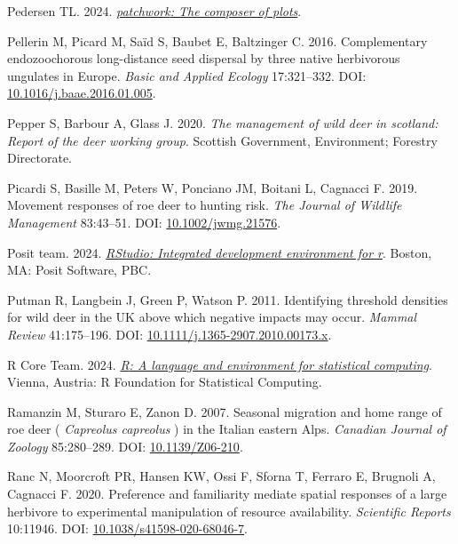 \documentclass[10pt,a4paper]{article}
\newlength{\cslhangindent}
\newenvironment{CSLReferences}[2] %
 {\begin{list}{}{%
  \setlength{\itemindent}{0pt}
  \setlength{\leftmargin}{0pt}
  \setlength{\parsep}{0pt}
  \ifodd #1
   \setlength{\leftmargin}{\cslhangindent}
   \setlength{\itemindent}{-1\cslhangindent}
  \fi
  \setlength{\itemsep}{#2\baselineskip}}}
 {\end{list}}
\begin{document}
\begin{CSLReferences}{1}{0}
Pedersen TL. 2024. \emph{\href{https://CRAN.R-project.org/package=patchwork}{{patchwork}: The composer of plots}}.

Pellerin M, Picard M, Saïd S, Baubet E, Baltzinger C. 2016. Complementary endozoochorous long-distance seed dispersal by three native herbivorous ungulates in {Europe}. \emph{Basic and Applied Ecology} 17:321--332. DOI: \href{https://doi.org/10.1016/j.baae.2016.01.005}{10.1016/j.baae.2016.01.005}.

Pepper S, Barbour A, Glass J. 2020. \emph{The management of wild deer in scotland: Report of the deer working group}. Scottish Government, Environment; Forestry Directorate.

Picardi S, Basille M, Peters W, Ponciano JM, Boitani L, Cagnacci F. 2019. Movement responses of roe deer to hunting risk. \emph{The Journal of Wildlife Management} 83:43--51. DOI: \href{https://doi.org/10.1002/jwmg.21576}{10.1002/jwmg.21576}.

Posit team. 2024. \emph{\href{http://www.posit.co/}{{RStudio}: Integrated development environment for r}}. Boston, MA: Posit Software, PBC.

Putman R, Langbein J, Green P, Watson P. 2011. Identifying threshold densities for wild deer in the {UK} above which negative impacts may occur. \emph{Mammal Review} 41:175--196. DOI: \href{https://doi.org/10.1111/j.1365-2907.2010.00173.x}{10.1111/j.1365-2907.2010.00173.x}.

R Core Team. 2024. \emph{\href{https://www.R-project.org/}{{R}: A language and environment for statistical computing}}. Vienna, Austria: R Foundation for Statistical Computing.

Ramanzin M, Sturaro E, Zanon D. 2007. Seasonal migration and home range of roe deer ( \emph{{Capreolus} capreolus} ) in the {Italian} eastern {Alps}. \emph{Canadian Journal of Zoology} 85:280--289. DOI: \href{https://doi.org/10.1139/Z06-210}{10.1139/Z06-210}.

Ranc N, Moorcroft PR, Hansen KW, Ossi F, Sforna T, Ferraro E, Brugnoli A, Cagnacci F. 2020. Preference and familiarity mediate spatial responses of a large herbivore to experimental manipulation of resource availability. \emph{Scientific Reports} 10:11946. DOI: \href{https://doi.org/10.1038/s41598-020-68046-7}{10.1038/s41598-020-68046-7}.


\end{CSLReferences}
\end{document}
